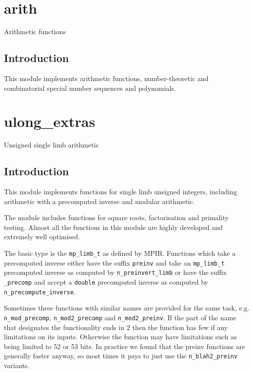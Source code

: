 \documentclass[a4paper,10pt]{book}
\newcommand{\code}{\lstinline}
\begin{document}
{{\chapter{arith}
\epigraph{Arithmetic functions}{}

\section{Introduction}

This module implements arithmetic functions, number-theoretic and
combinatorial special number sequences and polynomials.




\chapter{ulong\_extras}
\epigraph{Unsigned single limb arithmetic}{}

\section{Introduction}

This module implements functions for single limb unsigned integers,
including arithmetic with a precomputed inverse and modular arithmetic.

The module includes functions for square roots, factorisation and
primality testing. Almost all the functions in this module are highly
developed and extremely well optimised.

The basic type is the \code{mp_limb_t} as defined by MPIR. Functions
which take a precomputed inverse either have the suffix \code{preinv}
and take an \code{mp_limb_t} precomputed inverse as computed by
\code{n_preinvert_limb} or have the suffix \code{_precomp} and accept
a \code{double} precomputed inverse as computed by
\code{n_precompute_inverse}.

Sometimes three functions with similar names are provided for the
same task, e.g. \code{n_mod_precomp}, \code{n_mod2_precomp} and
\code{n_mod2_preinv}. If the part of the name that designates the
functionality ends in 2 then the function has few if any limitations
on its inputs. Otherwise the function may have limitations such as
being limited to 52 or 53 bits. In practice we found that the
preinv functions are generally faster anyway, so most times it pays
to just use the \code{n_blah2_preinv} variants.

}}
\end{document}
